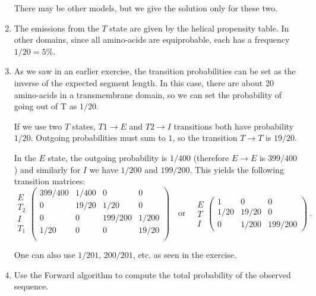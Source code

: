 \documentclass[a4paper,11pt]{article}
\begin{document}
\begin{enumerate}
There may be other models, but we give the solution only for these two.

\item The emissions from the $T$ state are given by the helical
  propensity table. 
In other domains, since all amino-acids are equiprobable, 
each has a frequency $1/20=5\%$.

\item As we saw in an earlier exercise, the transition probabilities
  can be set as the inverse of the expected segment length.
In this case, there are about 20 amino-acids in a transmembrane domain, so we can set the probability of
going out of T as $1/20$.

If we use two $T$ states, $T1\rightarrow E$ and $T2\rightarrow I$
transitions both have probability $1/20$.
Outgoing probabilities must sum to $1$, so the transition $T\rightarrow T$ is $19/20$. 

In the $E$ state, the outgoing probability is $1/400$ (therefore $E\rightarrow E$ is 
$399/400$) and similarly for $I$ we have $1/200$ and $199/200$. This
yields the following transition matrices:
$$
\begin{array}{c}
E \\ T_2 \\ I \\ T_1
\end{array}
\left( 
\begin{array}{cccc}
399/400 & 1/400 & 0            & 0 \\
0            & 19/20 & 1/20       & 0 \\
0            & 0        & 199/200 & 1/200 \\
1/20       & 0        & 0            & 19/20 \\
\end{array}
\right)
\quad \mbox{or} \quad 
\begin{array}{c}
E \\ T \\ I
\end{array}
\left( 
\begin{array}{ccc}
1 & 0 & 0 \\
1/20       & 19/20 & 0 \\
0            & 1/200 & 199/200 
\end{array}
\right)~.
$$

One can also use $1/201$, $200/201$, etc. as seen in the exercise. 

\item Use the Forward algorithm to compute the total probability of
  the observed sequence.


\end{enumerate}
\end{document}
